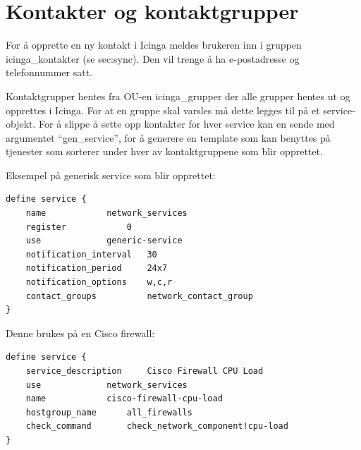 \section{Kontakter og kontaktgrupper}

For å opprette en ny kontakt i Icinga meldes brukeren inn i gruppen icinga\_kontakter (se sec:sync). Den vil trenge å ha e-postadresse og telefonnummer satt.

Kontaktgrupper hentes fra OU-en icinga\_grupper der alle grupper hentes ut og opprettes i Icinga. For at en gruppe skal varsles må dette legges til på et service-objekt. For å slippe å sette opp kontakter for hver service kan en sende med argumentet ``gen\_service'', for å generere en template som kan benyttes på tjenester som sorterer under hver av kontaktgruppene som blir opprettet.

Eksempel på generisk service som blir opprettet:
\begin{lstlisting}[style=example]
define service {
    name 		    network_services
    register 		    0
    use 		    generic-service     
    notification_interval   30
    notification_period     24x7
    notification_options    w,c,r
    contact_groups          network_contact_group
}
\end{lstlisting}

Denne brukes på en Cisco firewall: 
\begin{lstlisting}[style=example]
define service {
    service_description 	Cisco Firewall CPU Load
    use 			network_services
    name 			cisco-firewall-cpu-load
    hostgroup_name 		all_firewalls
    check_command 		check_network_component!cpu-load
}
\end{lstlisting}

